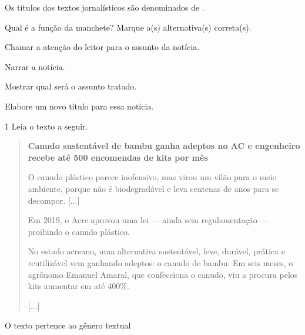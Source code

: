 \begin{escolha}
\begin{escolha}
\begin{escolha}
\item Os títulos dos textos jornalísticos são denominados de .

\item Qual é a função da manchete? Marque a(s) alternativa(s) correta(s).

\begin{boxlist}
\boxitem[\rosa{X}] Chamar a atenção do leitor para o assunto da notícia.

\boxitem[] Narrar a notícia.

\boxitem[\rosa{X}] Mostrar qual será o assunto tratado.
\end{boxlist}

\item Elabore um novo título para essa notícia.



\num{1} Leia o texto a seguir.

\begin{quote}
\textbf{Canudo sustentável de bambu ganha adeptos no AC e engenheiro
recebe até 500 encomendas de kits por mês}

O canudo plástico parece inofensivo, mas virou um vilão para o meio
ambiente, porque não é biodegradável e leva centenas de anos para se
decompor. {[}...{]}

Em 2019, o Acre aprovou uma lei --- ainda sem regulamentação ---
proibindo o canudo plástico.

No estado acreano, uma alternativa sustentável, leve, durável, prática e
reutilizável vem ganhando adeptos: o canudo de bambu. Em seis meses, o
agrônomo Emanuel Amaral, que confecciona o canudo, viu a procura pelos
kits aumentar em até 400\%.

{[}...{]}
\end{quote}


O texto pertence ao gênero textual


\end{escolha}
\end{escolha}
\end{escolha}
